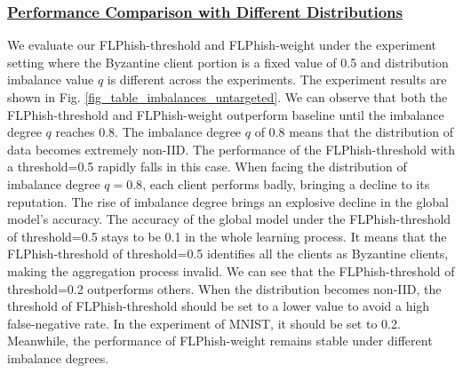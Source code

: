 \documentclass[journal]{IEEEtran}
\begin{document}
    \subsubsection{\ul{Performance Comparison with Different Distributions}} We evaluate our FLPhish-threshold and FLPhish-weight under the experiment setting where the Byzantine client portion is a fixed value of 0.5 and distribution imbalance value $q$ is different across the experiments. The experiment results are shown in Fig. \ref{fig_table_imbalances_untargeted}. We can observe that both the FLPhish-threshold and FLPhish-weight outperform baseline until the imbalance degree $q$ reaches 0.8. The imbalance degree $q$ of 0.8 means that the distribution of data becomes extremely non-IID. The performance of the FLPhish-threshold with a threshold=0.5 rapidly falls in this case. When facing the distribution of imbalance degree $q=0.8$, each client performs badly, bringing a decline to its reputation. The rise of imbalance degree brings an explosive decline in the global model's accuracy. The accuracy of the global model under the FLPhish-threshold of threshold=0.5 stays to be 0.1 in the whole learning process. It means that the FLPhish-threshold of threshold=0.5 identifies all the clients as Byzantine clients, making the aggregation process invalid. We can see that the FLPhish-threshold of threshold=0.2 outperforms others. When the distribution becomes non-IID, the threshold of FLPhish-threshold should be set to a lower value to avoid a high false-negative rate. In the experiment of MNIST, it should be set to 0.2. Meanwhile, the performance of FLPhish-weight remains stable under different imbalance degrees.
    


    
\end{document}
